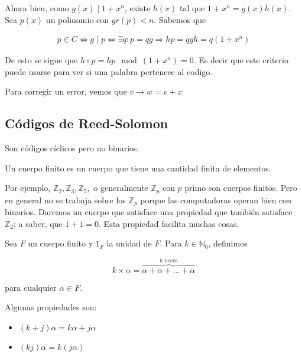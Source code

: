 \documentclass[a4paper]{article}
\begin{document}
Ahora bien, como $g(x) \mid 1 + x^n$, existe $h(x)$ tal que $1 + x^n = g(x)
h(x)$. Sea $p(x)$ un polinomio con $gr(p) < n$. Sabemos que 

\begin{align*} 
    p \in C \iff g \mid p \iff \exists  q : p = qg \Rightarrow hp = qgh = q (1 + x^n)
\end{align*}

De esto se sigue que $h \circ p = hp \mod (1 + x^n) = 0$. Es decir que 
este criterio puede usarse para ver si una palabra pertenece 
al codigo.

Para corregir un error, vemos que $v \to w = v + x$

\pagebreak 

\pagebreak 

\subsection{Códigos de Reed-Solomon}

Son códigos cíclicos pero no binarios. 

\begin{definition}
    Un cuerpo finito es un cuerpo que tiene una cantidad finita de elementos.
\end{definition}

Por ejemplo, $\mathbb{Z}_2, \mathbb{Z}_3, \mathbb{Z}_5,$ o generalmente
$\mathbb{Z}_p$ con $p$ primo son cuerpos finitos. Pero en general no se 
trabaja sobre los $\mathbb{Z}_p$ porque las computadoras operan 
bien con binarios. Daremos un cuerpo que satisface una propiedad
que también satisface $\mathbb{Z}_2$; a saber, que $1 + 1 = 0$.
Esta propiedad facilita muchas cosas.

\begin{definition}
    Sea $F$ un cuerpo finito y $1_F$ la unidad de $F$. Para 
    $k \in \mathbb{N}_0$, definimos 

    $$k \times \alpha = \overbrace{\alpha + \alpha + \ldots + \alpha}^{k \text{ veces}}$$

    para cualquier $\alpha \in F$.
\end{definition}

Algunas propiedades son:

\begin{itemize}
    \item $(k+j) \alpha = k \alpha + j \alpha$
    \item $(kj)\alpha = k(j\alpha)$
\end{itemize}
\end{document}

